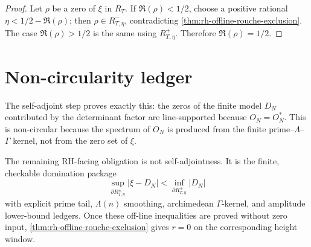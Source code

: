 \begin{proof}
Let $\rho$ be a zero of $\xi$ in $R_T$.  If $\Re(\rho)<1/2$, choose a positive
rational $\eta<1/2-\Re(\rho)$; then $\rho\in R^-_{T,\eta}$, contradicting
\autoref{thm:rh-offline-rouche-exclusion}.  The case $\Re(\rho)>1/2$ is the
same using $R^+_{T,\eta}$.  Therefore $\Re(\rho)=1/2$.
\end{proof}

\section{Non-circularity ledger}
\label{sec:rh-finite-hermitian-noncircularity-ledger}

\begin{principle}
\label{prin:rh-what-self-adjointness-proves}
The self-adjoint step proves exactly this: the zeros of the finite model
$D_N$ contributed by the determinant factor are line-supported because
$O_N=O_N^*$.  This is non-circular because the spectrum of $O_N$ is produced
from the finite prime--$\Lambda$--$\Gamma$ kernel, not from the zero set of
$\xi$.
\end{principle}

\begin{principle}
\label{prin:rh-what-remains-analytic}
The remaining RH-facing obligation is not self-adjointness.  It is the finite,
checkable domination package
$$
\sup_{\partial R^{\pm}_{T,\eta}}|\xi-D_N|
<
\inf_{\partial R^{\pm}_{T,\eta}}|D_N|
$$
with explicit prime tail, $\Lambda(n)$ smoothing, archimedean $\Gamma$-kernel,
and amplitude lower-bound ledgers.  Once these off-line inequalities are
proved without zero input, \autoref{thm:rh-offline-rouche-exclusion} gives
$r=0$ on the corresponding height window.
\end{principle}

